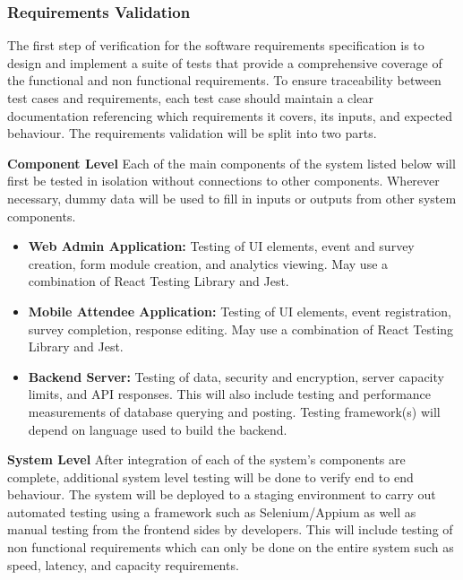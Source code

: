 \documentclass[12pt, titlepage]{article}
\begin{document}
\subsubsection{Requirements Validation}
The first step of verification for the software requirements specification is to design and implement a suite of tests that provide a comprehensive coverage of the functional and non functional requirements. To ensure traceability between test cases and requirements, each test case should maintain a clear documentation referencing which requirements it covers, its inputs, and expected behaviour. The requirements validation will be split into two parts. 

\textbf{Component Level}
Each of the main components of the system listed below will first be tested in isolation without connections to other components. Wherever necessary, dummy data will be used to fill in inputs or outputs from other system components.
\begin{itemize}
  \item \textbf{Web Admin Application:} Testing of UI elements, event and survey creation, form module creation, and analytics viewing. May use a combination of React Testing Library and Jest.
  \item \textbf{Mobile Attendee Application:} Testing of UI elements, event registration, survey completion, response editing. May use a combination of React Testing Library and Jest.
  \item \textbf{Backend Server:} Testing of data, security and encryption, server capacity limits, and API responses. This will also include testing and performance measurements of database querying and posting. Testing framework(s) will depend on language used to build the backend. 
\end{itemize}

\textbf{System Level}
  After integration of each of the system's components are complete, additional system level testing will be done to verify end to end behaviour. The system will be deployed to a staging environment to carry out automated testing using a framework such as Selenium/Appium as well as manual testing from the frontend sides by developers. This will include testing of non functional requirements which can only be done on the entire system such as speed, latency, and capacity requirements.
\end{document}
